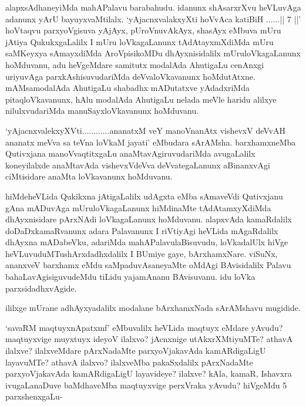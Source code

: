 \begin{artha}
alapxsAdhaneyiMda mahAPalavu barabahudu. idanunx shAsarxrXvu heVLuvAga adanunx yArU bayuyxvaMtilalx. `yAjacnxvalakxyXti hoVvAca katiBiH ......|| 7 ||' hoVtaqvu parxyoVgisuva yAjAyx, pUroVnuvAkAyx, shasAyx eMbuva mUru jAtiya QukukxgaLalilx I mUru loVkagaLanunx tAdAtayxmXdiMda  mUru saMKeyxya sAmayxdiMda AroVpisikoMDu dhAyxnisidalilx mUruloVkagaLanunx hoMduvanu, adu heVgeMdare samitutx modalAda AhutigaLu cenAnxgi uriyuvAga parxkAshisuvudariMda deVvaloVkavanunx hoMdutAtxne. mAMsamodalAda AhutigaLu shabadhx mADutatxve yAdadxriMda pitaqloVkavanunx, hAlu modalAda AhutigaLu nelada meVle haridu alilxye nilulxvudariMda manuSayxloVkavanunx hoMduvanu.

`yAjacnxvalekxyXVti............ananatxM veY manoV\s nanAtx vishevxV deVvAH ananatx meVva sa teVna loVkaM jayati' eMbudara sArAMsha. barxhamxneMba Qutivxjana manoVvaqtitxgaLu 
anaMtavAgiruvudariMda avugaLalilx koneyilalxde anaMtavAda vishevxVdeVva deVvategaLanunx 
aBinanxvAgi ciMtisidare anaMta loVkavanunx hoMduvanu.
\end{artha}

\centerline{}

\begin{artha}
hiMdeheVLida  Qukikxna jAtigaLalilx udAgxta eMba sAmaveVdi Qutivxjanu  gAna mADuvAga mUruloVkagaLanunx hiMdinaMte tAdAtamxyXdiMda dhAyxnisidare pArxNAdi loVkagaLanunx hoMduvanu. alapxvAda kamaRdalilx doDaDxkamaRvanunx adara Palavanunx I riVtiyAgi heVLida mAgaRdalilx dhAyxna mADabeVku, adariMda mahAPalavulaBisuvudu, loVkadalUlx hiVge heVLuvuduMTu\ndash  shArxdadhxdalilx I BUmiye gaye, bArxhamxNare. viSuNx, ananxveV barxhamx eMdu saMpaduvAsaneyaMte oMdAgi BAvisidalilx Palavu bahaLavAgisiguvudeMdu tiLidu yajamAnanu BAvisuvanu. idu loVka parxsidadhxvAgide.
\end{artha}

\begin{artha}ililxge mUrane adhAyxyadalilx modalane bArxhamxNada sArAMshavu mugidide.\end{artha}


\begin{artha}
`savaRM maqtuyxnA\s \s patxmf' eMbuvalilx heVLida maqtuyx eMdare yAvudu? maqtuyxvige muyxtuyx ideyoV ilalxvo? jAcnxnige  utAkxrXMtiyuMTe? athavA ilalxve? ilalxveMdare pArxNadaMte parxyoVjakavAda kamARdigaLigU layavuMTe? athavA ilalxvo? ilalxveMba pakaSxdalilx pArxNadaMte parxyoVjakavAda kamARdigaLigU layavideye? ilalxve?  kAla, kamaR, Ishavxra ivugaLanaDuve baMdhaveMba maqtuyxvige perxVraka yAvudu? hiVgeMdu 5 parxshenxgaLu-
\end{artha}

